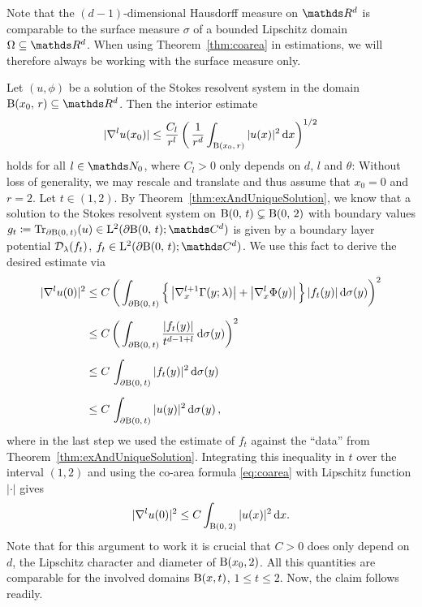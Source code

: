 Note that the $(d-1)$-dimensional Hausdorff measure on $\R^d$ is comparable to the surface measure $\sigma$ of a bounded Lipschitz domain $\Omega \subseteq \R^d$.
When using Theorem~\ref{thm:coarea} in estimations, we will therefore always be working with the surface measure only.

\begin{rem}
  Let $(u,\phi)$ be a solution of the Stokes resolvent system in the domain $\BB(x_0,\, r) \subseteq \R^d$.
  Then the interior estimate
  \begin{align}
    \label{eq:interiorEstimateDoubleLayer}
    |\nabla^l u(x_0) | \leq \frac{C_l}{r^{l}} \, \bigg( \, \frac{1}{r^d} \int_{\mathrm{B}(x_0,\, r)} |u(x)|^2 \, {\operatorname{d}\!{x}} \bigg)^{1/2}
  \end{align}
  holds for all $l \in \N_0$, where $C_l > 0$ only depends on $d$, $l$ and $\theta$:
  Without loss of generality, we may rescale and translate and thus assume that $x_0 = 0$ and $r = 2$.
  Let $t \in (1,2)$. 
  By Theorem~\ref{thm:exAndUniqueSolution}, we know that a solution to the Stokes resolvent system on $\mathrm{B}(0,\, t) \subsetneq \mathrm{B}(0,\,2)$ with boundary values $g_t \coloneqq \operatorname{Tr}_{\partial\BB(0,\,t)} (u) \in \Ell^2(\partial\BB(0,\,t); \C^d)$ is given by a boundary layer potential $\mathcal{D}_\lambda(f_t)$, $f_t \in \Ell^2(\partial\BB(0,\,t); \C^d)$.
  We use this fact to derive the desired estimate via
  \begin{align*}
    |\nabla^l u(0)|^2 
    &\leq C\, \bigg( \int_{\partial \mathrm{B}(0,\, t)} \Big\{ \, \big|\nabla_x^{l+1} \Gamma(y; \lambda)\big|  + \big|\nabla_x^l \Phi(y) \big| \, \Big\} \, |f_t(y)| \, {\operatorname{d}\!{\sigma}}(y)\bigg)^2 \\[0.5em]
    &\leq C\, \bigg( \int_{\partial \mathrm{B}(0,\,t)} \frac{|f_t(y)|}{t^{d - 1 + l}}  \, {\operatorname{d}\!{\sigma}}(y)\bigg)^2 \\[0.5em]
    &\leq C\, \int_{\partial \mathrm{B}(0,\,t)} |f_t(y)|^2  \, {\operatorname{d}\!{\sigma}}(y) \\[0.5em]
    &\leq C\, \int_{\partial \mathrm{B}(0,\,t)} |u(y)|^2 \, {\operatorname{d}\!{\sigma}}(y)\,, 
  \end{align*}
  where in the last step we used the estimate of $f_t$ against the ``data'' from Theorem~\ref{thm:exAndUniqueSolution}.
  Integrating this inequality in $t$ over the interval $(1,2)$ and using the co-area formula \eqref{eq:coarea} with Lipschitz function $|\cdot|$ gives 
  \begin{align*}
    |\nabla^l u(0)|^2 \leq C \int_{\mathrm{B}(0,\,2)} |u(x)|^2 \, {\operatorname{d}\!{x}}.
  \end{align*}
  Note that for this argument to work it is crucial that $C > 0$ does only depend on $d$, the Lipschitz character and diameter of $\mathrm{B}(x_0,2)$.
  All this quantities are comparable for the involved domains $\mathrm{B}(x, t)$, $1 \leq t \leq 2$.
  Now, the claim follows readily.
\end{rem}


